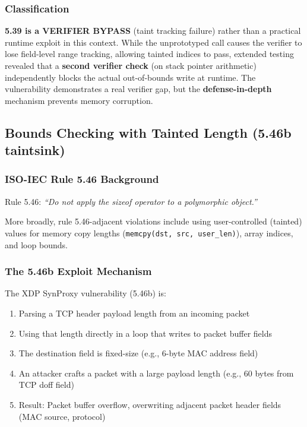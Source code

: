 \subsubsection{Classification}

\textbf{5.39 is a VERIFIER BYPASS} (taint tracking failure) rather than a practical runtime exploit in this context. While the unprototyped call causes the verifier to lose field-level range tracking, allowing tainted indices to pass, extended testing revealed that a \textbf{second verifier check} (on stack pointer arithmetic) independently blocks the actual out-of-bounds write at runtime. The vulnerability demonstrates a real verifier gap, but the \textbf{defense-in-depth} mechanism prevents memory corruption.

\subsection{Bounds Checking with Tainted Length (5.46b taintsink)}

\subsubsection{ISO-IEC Rule 5.46 Background}

Rule 5.46: \textit{``Do not apply the sizeof operator to a polymorphic object.''}

More broadly, rule 5.46-adjacent violations include using user-controlled (tainted) values for memory copy lengths (\texttt{memcpy(dst, src, user\_len)}), array indices, and loop bounds.

\subsubsection{The 5.46b Exploit Mechanism}

The XDP SynProxy vulnerability (5.46b) is:
\begin{enumerate}[label=\arabic*.]
  \item Parsing a TCP header payload length from an incoming packet
  \item Using that length directly in a loop that writes to packet buffer fields
  \item The destination field is fixed-size (e.g., 6-byte MAC address field)
  \item An attacker crafts a packet with a large payload length (e.g., 60 bytes from TCP doff field)
  \item Result: Packet buffer overflow, overwriting adjacent packet header fields (MAC source, protocol)
\end{enumerate}

